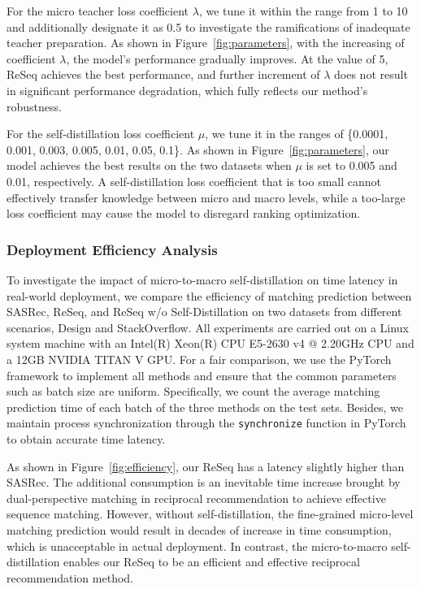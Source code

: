 For the micro teacher loss coefficient $\lambda$, we tune it within the range from 1 to 10 and additionally designate it as 0.5 to investigate the ramifications of inadequate teacher preparation. 
As shown in Figure~\ref{fig:parameters}, with the increasing of coefficient $\lambda$, the model's performance gradually improves. At the value of 5, ReSeq achieves the best performance, and further increment of $\lambda$ does not result in significant performance degradation, which fully reflects our method's robustness.

For the self-distillation loss coefficient $\mu$, we tune it in the ranges of \{0.0001, 0.001, 0.003, 0.005, 0.01, 0.05, 0.1\}. 
As shown in Figure~\ref{fig:parameters}, our model achieves the best results on the two datasets when $\mu$ is set to 0.005 and 0.01, respectively. A self-distillation loss coefficient that is too small cannot effectively transfer knowledge between micro and macro levels, while a too-large loss coefficient may cause the model to disregard ranking optimization.


\subsubsection{Deployment Efficiency Analysis}
To investigate the impact of micro-to-macro self-distillation on time latency in real-world deployment, we compare the efficiency of matching prediction between SASRec, ReSeq, and ReSeq w/o Self-Distillation on two datasets from different scenarios, \ie Design and StackOverflow.
All experiments are carried out on a Linux system machine with an Intel(R) Xeon(R) CPU E5-2630 v4 @ 2.20GHz CPU and a 12GB NVIDIA TITAN V GPU. For a fair comparison, we use the PyTorch framework to implement all methods and ensure that the common parameters such as batch size are uniform.
Specifically, we count the average matching prediction time of each batch of the three methods on the test sets. Besides, we maintain process synchronization through the \texttt{synchronize} function in PyTorch to obtain accurate time latency.

As shown in Figure~\ref{fig:efficiency}, our ReSeq has a latency slightly higher than SASRec. The additional consumption is an inevitable time increase brought by dual-perspective matching in reciprocal recommendation to achieve effective sequence matching.
However, without self-distillation, the fine-grained micro-level matching prediction would result in decades of increase in time consumption, which is unacceptable in actual deployment. In contrast, the micro-to-macro self-distillation enables our ReSeq to be an efficient and effective reciprocal recommendation method.


